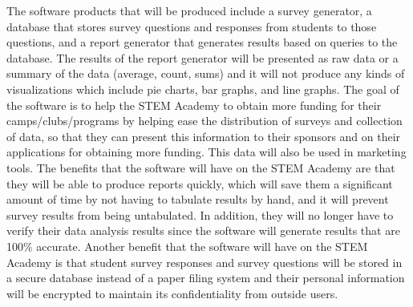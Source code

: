 \documentclass[letterpaper,10pt,serif, draftclsnofoot,onecolumn, compsoc, titlepage]{IEEEtran}
\begin{document}
The software products that will be produced include a survey generator, a database that stores survey questions and responses from students to those questions, and a report generator that generates results based on queries to the database.  
The results of the report generator will be presented as raw data or a summary of the data (average, count, sums) and it will not produce any kinds of visualizations which include pie charts, bar graphs, and line graphs.  
The goal of the software is to help the STEM Academy to obtain more funding for their camps/clubs/programs by helping ease the distribution of surveys and collection of data, so that they can present this information to their sponsors and on their applications for obtaining more funding. This data will also be used in marketing tools. 
The benefits that the software will have on the STEM Academy are that they will be able to produce reports quickly, which will save them a significant amount of time by not having to tabulate results by hand, and it will prevent survey results from being untabulated.
 In addition, they will no longer have to verify their data analysis results since the software will generate results that are 100\% accurate.
 Another benefit that the software will have on the STEM Academy is that student survey responses and survey questions will be stored in a secure database instead of a paper filing system and their personal information will be encrypted to maintain its confidentiality from outside users. 
\end{document}
